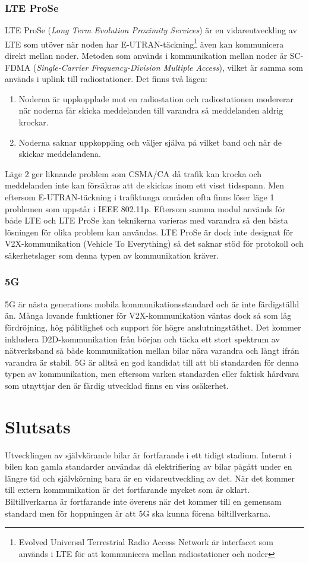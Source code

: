 \documentclass[a4paper]{IEEEtran}
\begin{document}
\subsubsection{LTE ProSe}
LTE ProSe (\emph{Long Term Evolution Proximity Services}) är en vidareutveckling av LTE som utöver när noden har E-UTRAN-täckning\footnote{Evolved Universal Terrestrial Radio Access Network är interfacet som används i LTE för att kommunicera mellan radiostationer och noder} även kan kommunicera direkt mellan noder.
Metoden som används i kommunikation mellan noder är SC-FDMA (\emph{Single-Carrier Frequency-Division Multiple Access}), vilket är samma som används i uplink till radiostationer. Det finns två lägen:
\begin{enumerate}
	\item Noderna är uppkopplade mot en radiostation och radiostationen modererar när noderna får skicka meddelanden till varandra så meddelanden aldrig krockar.
	\item Noderna saknar uppkoppling och väljer själva på vilket band och när de skickar meddelandena.
\end{enumerate}
Läge 2 ger liknande problem som CSMA/CA då trafik kan krocka och meddelanden inte kan försäkras att de skickas inom ett visst tidsspann.
Men eftersom E-UTRAN-täckning i trafiktunga områden ofta finns löser läge 1 problemen som uppstår i IEEE 802.11p.
Eftersom samma modul används för både LTE och LTE ProSe kan teknikerna varieras med varandra så den bästa lösningen för olika problem kan användas.
LTE ProSe är dock inte designat för V2X-kommunikation (Vehicle To Everything) så det saknar stöd för protokoll och säkerhetslager som denna typen av kommunikation kräver.
\subsubsection{5G}
5G är nästa generations mobila kommunikationsstandard och är inte färdigställd än. Många lovande funktioner för V2X-kommunikation väntas dock så som låg fördröjning, hög pålitlighet och support för högre anslutningstäthet.
Det kommer inkludera D2D-kommunikation från början och täcka ett stort spektrum av nätverksband så både kommunikation mellan bilar nära varandra och långt ifrån varandra är stabil.
5G är alltså en god kandidat till att bli standarden för denna typen av kommunikation, men eftersom varken standarden eller faktisk hårdvara som utnyttjar den är färdig utvecklad finns en viss osäkerhet.

\section{Slutsats}
Utvecklingen av självkörande bilar är fortfarande i ett tidigt stadium. Internt i bilen kan gamla standarder användas då elektrifiering av bilar pågått under en längre tid och självkörning bara är en vidareutveckling av det. När det kommer till extern kommunikation är det fortfarande mycket som är oklart. Biltillverkarna är fortfarande inte överens när det kommer till en gemensam standard men för hoppningen är att 5G ska kunna förena biltillverkarna.
\end{document}
